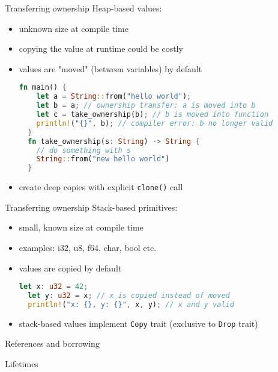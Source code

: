 \documentclass{beamer}
\begin{document}
\begin{frame}[fragile]{Transferring ownership}
Heap-based values: 
\begin{itemize}
  \item unknown size at compile time
  \item copying the value at runtime could be costly
  \item values are "moved" (between variables) by default

  \begin{lstlisting}[language=Rust]
  fn main() {
    let a = String::from("hello world");
    let b = a; // ownership transfer: a is moved into b
    let c = take_ownership(b); // b is moved into function
    println!("{}", b); // compiler error: b no longer valid
  }
  fn take_ownership(s: String) -> String {
    // do something with s
    String::from("new hello world")
  }
  \end{lstlisting}
  \item create deep copies with explicit \verb|clone()| call
\end{itemize}
\end{frame}


\begin{frame}[fragile]{Transferring ownership}
Stack-based primitives: 
\begin{itemize}
  \item small, known size at compile time
  \item examples: i32, u8, f64, char, bool etc.
  \item values are copied by default

  \begin{lstlisting}[language=Rust]
  let x: u32 = 42;
  let y: u32 = x; // x is copied instead of moved
  println!("x: {}, y: {}", x, y); // x and y valid
  \end{lstlisting}
  \item stack-based values implement \verb|Copy| trait (exclusive to \verb|Drop| trait)
\end{itemize}
\end{frame}


\begin{frame}{References and borrowing}
\end{frame}


\begin{frame}{Lifetimes}
\end{frame}
\end{document}
